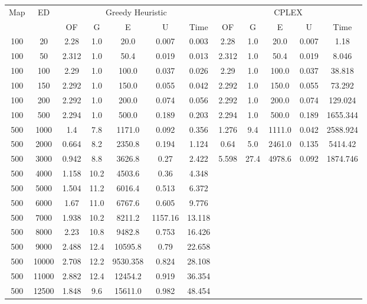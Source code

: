 \begin{table}[htb]
	\centering
	\begin{tabular}{|c|c|c|c|c|c|c|c|c|c|c|c|}
		\hline
		\multirow{2}{*}{Map} & \multirow{2}{*}{ED} & \multicolumn{5}{c|}{Greedy Heuristic} & \multicolumn{5}{c|}{CPLEX}\\ 
		\cline{3-12}
&& OF & G & E & U & Time & OF & G & E & U & Time\\ 
		\hline
		100 & 20 & 2.28 & 1.0 & 20.0 & 0.007 & 0.003 & 2.28 & 1.0 & 20.0 & 0.007 & 1.18 \\ 
		100 & 50 & 2.312 & 1.0 & 50.4 & 0.019 & 0.013 & 2.312 & 1.0 & 50.4 & 0.019 & 8.046 \\ 
		100 & 100 & 2.29 & 1.0 & 100.0 & 0.037 & 0.026 & 2.29 & 1.0 & 100.0 & 0.037 & 38.818 \\ 
		100 & 150 & 2.292 & 1.0 & 150.0 & 0.055 & 0.042 & 2.292 & 1.0 & 150.0 & 0.055 & 73.292 \\ 
		100 & 200 & 2.292 & 1.0 & 200.0 & 0.074 & 0.056 & 2.292 & 1.0 & 200.0 & 0.074 & 129.024 \\ 
		100 & 500 & 2.294 & 1.0 & 500.0 & 0.189 & 0.203 & 2.294 & 1.0 & 500.0 & 0.189 & 1655.344 \\ 
		500 & 1000 & 1.4 & 7.8 & 1171.0 & 0.092 & 0.356 & 1.276 & 9.4 & 1111.0 & 0.042 & 2588.924 \\ 
		500 & 2000 & 0.664 & 8.2 & 2350.8 & 0.194 & 1.124 & 0.64 & 5.0 & 2461.0 & 0.135 & 5414.42 \\ 
		500 & 3000 & 0.942 & 8.8 & 3626.8 & 0.27 & 2.422 & 5.598 & 27.4 & 4978.6 & 0.092 & 1874.746 \\ 
		500 & 4000 & 1.158 & 10.2 & 4503.6 & 0.36 & 4.348 & & & & &  \\ 
		500 & 5000 & 1.504 & 11.2 & 6016.4 & 0.513 & 6.372 & & & & &  \\ 
		500 & 6000 & 1.67 & 11.0 & 6767.6 & 0.605 & 9.776 & & & & &  \\ 
		500 & 7000 & 1.938 & 10.2 & 8211.2 & 1157.16 & 13.118 & & & & &  \\ 
		500 & 8000 & 2.23 & 10.8 & 9482.8 & 0.753 & 16.426 & & & & &  \\ 
		500 & 9000 & 2.488 & 12.4 & 10595.8 & 0.79 & 22.658 & & & & &  \\ 
		500 & 10000 & 2.708 & 12.2 & 9530.358 & 0.824 & 28.108 & & & & &  \\ 
		500 & 11000 & 2.882 & 12.4 & 12454.2 & 0.919 & 36.354 & & & & &  \\ 
		500 & 12500 & 1.848 & 9.6 & 15611.0 & 0.982 & 48.454 & & & & &  \\ 

\end{tabular}
\end{table}
